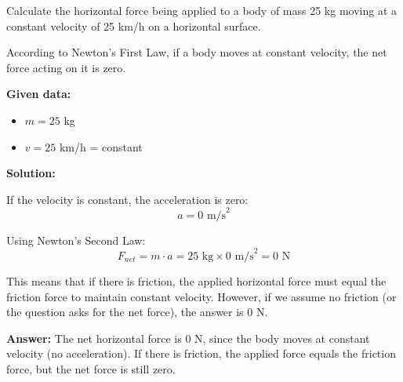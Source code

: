 \begin{exercise}
    Calculate the horizontal force being applied to a body of mass 25 kg moving at a constant velocity of 25 km/h on a horizontal surface.

    \begin{solu}
        According to Newton's First Law, if a body moves at constant velocity, the net force acting on it is zero.

        \textbf{Given data:}
        \begin{itemize}
            \item $m = 25$ kg
            \item $v = 25$ km/h = constant
        \end{itemize}

        \textbf{Solution:}

        If the velocity is constant, the acceleration is zero:
        $$a = 0\text{ m/s}^2$$

        Using Newton's Second Law:
        $$F_{net} = m \cdot a = 25\text{ kg} \times 0\text{ m/s}^2 = 0\text{ N}$$

        This means that if there is friction, the applied horizontal force must equal the friction force to maintain constant velocity. However, if we assume no friction (or the question asks for the net force), the answer is 0 N.

        \textbf{Answer:} The net horizontal force is 0 N, since the body moves at constant velocity (no acceleration). If there is friction, the applied force equals the friction force, but the net force is still zero.
    \end{solu}
\end{exercise}

